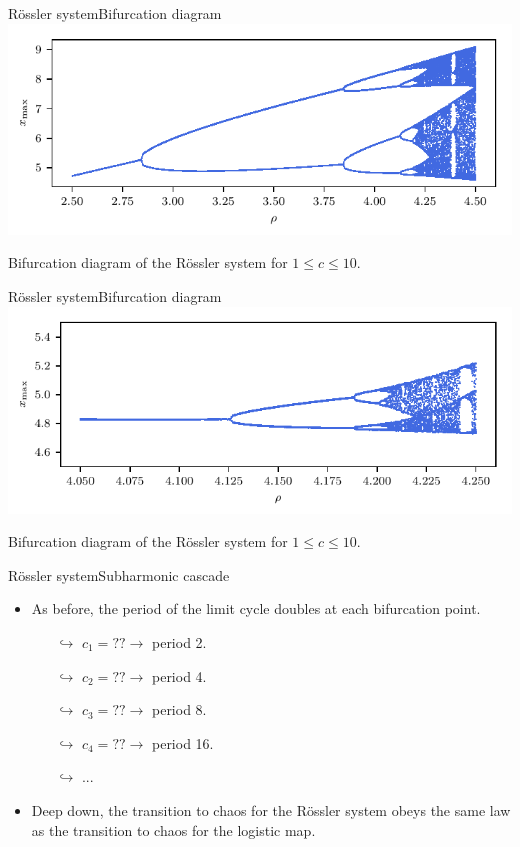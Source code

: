 \documentclass[usenames,dvipsnames,svgnames,10pt,aspectratio=169]{beamer}
\begin{document}
\begin{frame}[t, c]{R\"ossler system}{Bifurcation diagram}
	\centering
	\includegraphics[width=.75\textwidth]{rossler_bifurcation_diagram_zoom}

	Bifurcation diagram of the R\"ossler system for $1 \leq c \leq 10$.

	\vspace{1cm}
\end{frame}

\begin{frame}[t, c]{R\"ossler system}{Bifurcation diagram}
	\centering
	\includegraphics[width=.75\textwidth]{rossler_bifurcation_diagram_zoom_bis}

	Bifurcation diagram of the R\"ossler system for $1 \leq c \leq 10$.

	\vspace{1cm}
\end{frame}

\begin{frame}[t, c]{R\"ossler system}{Subharmonic cascade}
		\begin{itemize}
			\item As before, the period of the limit cycle doubles at each bifurcation point.
			\begin{itemize}
				\item[$\hookrightarrow$] $c_1 = ?? \to$ period 2.
				\item[$\hookrightarrow$] $c_2 = ?? \to$ period 4.
				\item[$\hookrightarrow$] $c_3 = ?? \to$ period 8.
				\item[$\hookrightarrow$] $c_4 = ?? \to$ period 16.
				\item[$\hookrightarrow$] ...
			\end{itemize}

			\bigskip

			\item Deep down, the transition to chaos for the R\"ossler system obeys the same law as the transition to chaos for the logistic map.
		\end{itemize}

		\vspace{1cm}
\end{frame}
\end{document}
